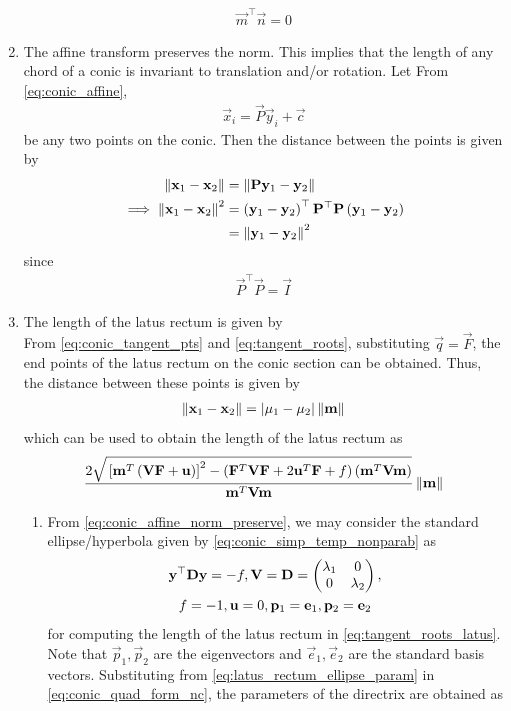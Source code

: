 \documentclass[journal,12pt,twocolumn]{IEEEtran}
\renewcommand\thesection{\arabic{section}}
\renewcommand\thesubsection{\thesection.\arabic{subsection}}
\begin{document}
\begin{enumerate}[label=\thesubsection.\arabic*.,ref=\thesubsection.\theenumi]
\begin{align}
	\vec{m}^{\top} \vec{n} = 0
\end{align}
\item The affine transform preserves the norm.  This implies that the length of any chord of a conic
	is invariant to translation and/or rotation.
	\solution Let 
From \eqref{eq:conic_affine}, 
\begin{align}
\vec{x}_i = \vec{P}\vec{y}_i+\vec{c} 
\label{eq:conic_affine_pts}
\end{align}
be any two points on the conic.  Then the distance between the points is given by 
\begin{align}
	\left\lVert\mathbf{x}_1-\mathbf{x}_2 \right\rVert &= \left\lVert\mathbf{P}	\mathbf{y}_1 -\mathbf{y}_2 \right\rVert
	\\
	\implies \left\lVert\mathbf{x}_1-\mathbf{x}_2 \right\rVert^2 &= 		\left(\mathbf{y}_1 -\mathbf{y}_2 \right)^{\top}\mathbf{P}^{\top}\mathbf{P}\left(\mathbf{y}_1 -\mathbf{y}_2 \right)
	\\
	&= 		\left\lVert\mathbf{y}_1 -\mathbf{y}_2 \right\rVert^2
\label{eq:conic_affine_norm_preserve}
\end{align}
since 
\begin{align}
	\vec{P}^{\top}\vec{P} = \vec{I}
\end{align}
\item The length of the latus rectum is given by 
	\solution 
\\
From 
\eqref{eq:conic_tangent_pts}
and
\eqref{eq:tangent_roots}, substituting $\vec{q} = \vec{F}$, the end points of the latus rectum on the conic
section can be obtained.  Thus, the distance between these points is given by 
\begin{align}
	\left\lVert\mathbf{x}_1-\mathbf{x}_2\right\rVert =  \left\vert\mu_1-\mu_2\right\vert \left\lVert\mathbf{m}\right\rVert
\label{eq:conic_tangent_pts_dist}
\end{align}
which can be used to obtain the length of the latus rectum as 
	{\tiny
\begin{multline}
 \frac{2\sqrt{
{}\left[
\mathbf{m}^T\left(\mathbf{V}\mathbf{F}+\mathbf{u}\right)
\right]^2
-
\left(
\mathbf{F}^T\mathbf{V}\mathbf{F} + 2\mathbf{u}^T\mathbf{F} +f
\right)
\left(\mathbf{m}^T\mathbf{V}\mathbf{m}\right)
}
}
{
\mathbf{m}^T\mathbf{V}\mathbf{m}
}\left\lVert\mathbf{m}\right\rVert
\label{eq:tangent_roots_latus}
\end{multline}
}
\begin{enumerate}
\item 
From \eqref{eq:conic_affine_norm_preserve}, we may consider the standard ellipse/hyperbola given by 
    \eqref{eq:conic_simp_temp_nonparab} as
  \begin{multline}
    \mathbf{y}^{\top}\mathbf{D}\mathbf{y} = -f,
	\mathbf{V} =     \mathbf{D} = \begin{pmatrix}\lambda_1 & 0 \\ 0 &\lambda_2\end{pmatrix},
	  \\
	   f = -1, \mathbf{u} = 0, \mathbf{p}_1 = \mathbf{e}_1, \mathbf{p}_2 = \mathbf{e}_2
	    \label{eq:latus_rectum_ellipse_param}
\end{multline}
for computing the length of the latus rectum in 
	  \eqref{eq:tangent_roots_latus}. Note that $\vec{p}_1, \vec{p}_2$ are the eigenvectors and $\vec{e}_1, \vec{e}_2$ are the standard basis vectors.  Substituting from 
	    \eqref{eq:latus_rectum_ellipse_param} in
\eqref{eq:conic_quad_form_nc},
	     the parameters of the directrix are obtained as 


\end{enumerate}
\end{enumerate}
\end{document}
